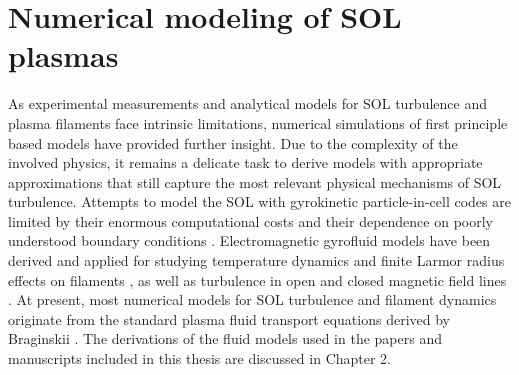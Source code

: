 \section{Numerical modeling of SOL plasmas}
As experimental measurements and analytical models for SOL turbulence and plasma
filaments face intrinsic limitations, numerical simulations of first principle based
models have provided further insight. Due to the complexity of the involved physics, it
remains a delicate task to derive models with appropriate approximations that still
capture the most relevant physical mechanisms of SOL turbulence. Attempts to model the
SOL with gyrokinetic particle-in-cell codes are limited by their enormous computational
costs and their dependence on poorly understood boundary conditions
\cite{chang2008spontaneous,churchill2017pedestal}. Electromagnetic gyrofluid models have
been derived \cite{madsen2013full} and applied for studying temperature dynamics and
finite Larmor radius effects on filaments
\cite{wiesenberger2014radial,held2016influence}, as well as turbulence in open and
closed magnetic field lines \cite{ribeiro2005tokamak,ribeiro2008gyrofluid}. At present,
most numerical models for SOL turbulence and filament dynamics originate from the
standard plasma fluid transport equations derived by Braginskii \cite{braginskii}. The
derivations of the fluid models used in the papers and manuscripts included in this
thesis are discussed in Chapter 2.

